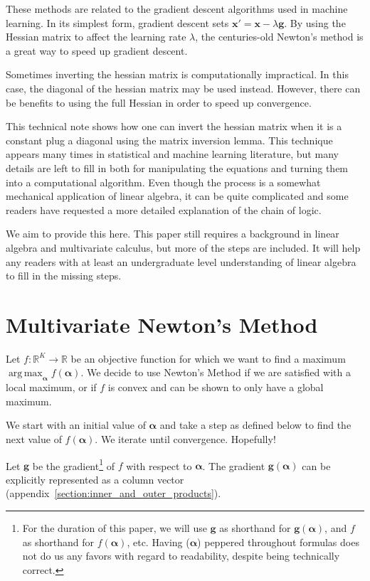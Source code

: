 \documentclass[twoside]{article}
\DeclareMathOperator*{\argmax}{arg\,max} %
\begin{document}
These methods are related to the gradient descent algorithms used in machine learning. In its simplest form, gradient descent sets $\boldsymbol{x}' = \boldsymbol{x} - \lambda\boldsymbol{g}$. By using the Hessian matrix to affect the learning rate $\lambda$, the centuries-old Newton's method is a great way to speed up gradient descent.

Sometimes inverting the hessian matrix is computationally impractical. In this case, the diagonal of the hessian matrix may be used instead\cite{becker}. However, there can be benefits to using the full Hessian in order to speed up convergence.

This technical note shows how one can invert the hessian matrix when it is a constant plug a diagonal using the matrix inversion lemma. This technique appears many times in statistical and machine learning literature, but many details are left to fill in both for manipulating the equations and turning them into a computational algorithm. Even though the process is a somewhat mechanical application of linear algebra, it can be quite complicated and some readers have requested a more detailed explanation of the chain of logic.

We aim to provide this here. This paper still requires a background in linear algebra and multivariate calculus, but more of the steps are included. It will help any readers with at least an undergraduate level understanding of linear algebra to fill in the missing steps.

\section{Multivariate Newton's Method}

Let $f: \mathbb{R}^K \rightarrow \mathbb{R}$ be an objective function for which we want to find a maximum $\argmax_{\boldsymbol{\alpha}} f(\boldsymbol{\alpha})$. We decide to use Newton's Method if we are satisfied with a local maximum, or if $f$ is convex and can be shown to only have a global maximum.

We start with an initial value of $\boldsymbol{\alpha}$ and take a step as defined below to find the next value of $f(\boldsymbol{\alpha})$. We iterate until convergence. Hopefully!

Let $\boldsymbol{g}$ be the gradient\footnote{For the duration of this paper, we will use $\boldsymbol{g}$ as shorthand for $\boldsymbol{g}(\boldsymbol{\alpha})$, and $f$ as shorthand for $f(\boldsymbol{\alpha})$, etc. Having ($\boldsymbol{\alpha}$) peppered throughout formulas does not do us any favors with regard to readability, despite being technically correct.} of $f$ with respect to $\boldsymbol{\alpha}$. The gradient $\boldsymbol{g}(\boldsymbol{\alpha})$ can be explicitly represented as a column vector (appendix~\ref{section:inner_and_outer_products}).
\end{document}
